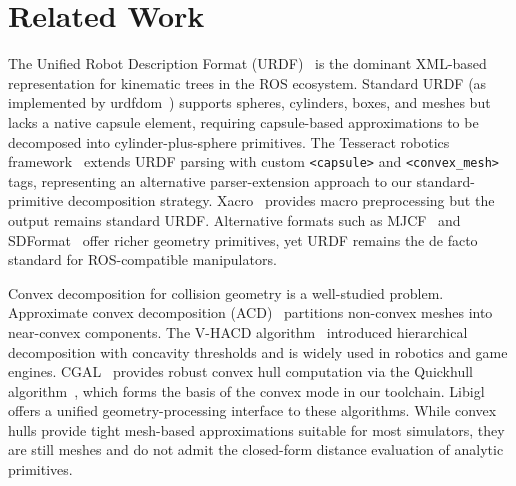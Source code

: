 \section{Related Work}
\label{sec:related}

The Unified Robot Description Format (URDF)~\cite{urdf_doc} is the dominant XML-based representation for kinematic trees in the ROS ecosystem.
Standard URDF (as implemented by urdfdom~\cite{urdfdom}) supports spheres, cylinders, boxes, and meshes but lacks a native capsule element, requiring capsule-based approximations to be decomposed into cylinder-plus-sphere primitives. The Tesseract robotics framework~\cite{tesseract_urdf} extends URDF parsing with custom \texttt{<capsule>} and \texttt{<convex\_mesh>} tags, representing an alternative parser-extension approach to our standard-primitive decomposition strategy. Xacro~\cite{xacro} provides macro preprocessing but the output remains standard URDF. Alternative formats such as MJCF~\cite{todorov2012mujoco} and SDFormat~\cite{sdformat} offer richer geometry primitives, yet URDF remains the de facto standard for ROS-compatible manipulators.

Convex decomposition for collision geometry is a well-studied problem.
Approximate convex decomposition (ACD)~\cite{lien2008acd} partitions non-convex meshes into near-convex components.
The V-HACD algorithm~\cite{mamou2016vhacd} introduced hierarchical decomposition with concavity thresholds and is widely used in robotics and game engines.
CGAL~\cite{cgal} provides robust convex hull computation via the Quickhull algorithm~\cite{barber1996quickhull}, which forms the basis of the convex mode in our toolchain.
Libigl~\cite{jacobson2018libigl} offers a unified geometry-processing interface to these algorithms.
While convex hulls provide tight mesh-based approximations suitable for most simulators, they are still meshes and do not admit the closed-form distance evaluation of analytic primitives.

